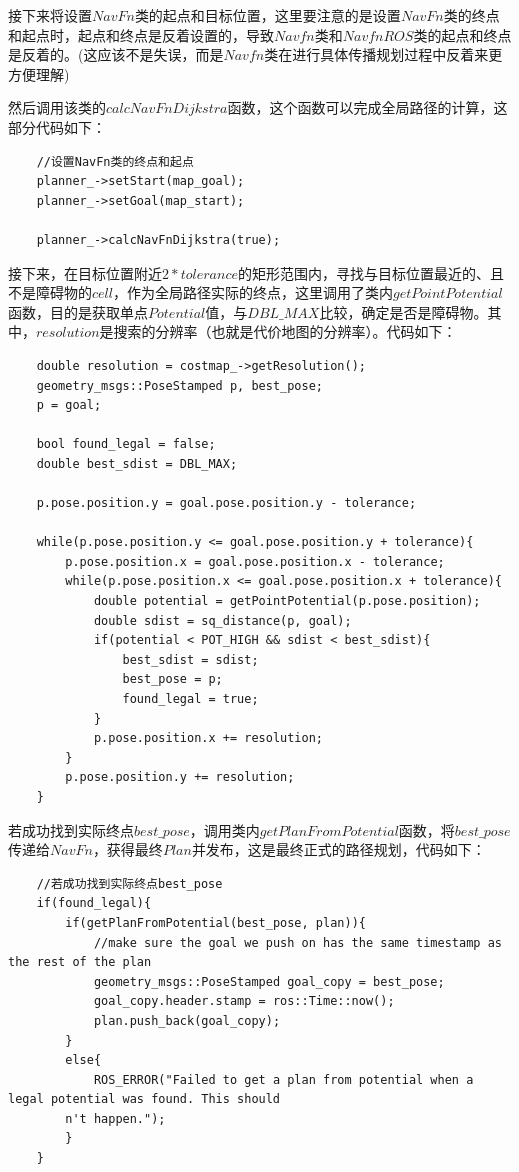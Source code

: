 \documentclass[9pt, oneside]{book}
\begin{document}
接下来将设置$NavFn$类的起点和目标位置，这里要注意的是设置$NavFn$类的终点和起点时，起点和终点是反着设置的，导致$Navfn$类和$NavfnROS$类的起点和终点是反着的。(这应该不是失误，而是$Navfn$类在进行具体传播规划过程中反着来更方便理解)

然后调用该类的$calcNavFnDijkstra$函数，这个函数可以完成全局路径的计算，这部分代码如下：

\begin{verbatim}
    //设置NavFn类的终点和起点
    planner_->setStart(map_goal);
    planner_->setGoal(map_start);

    planner_->calcNavFnDijkstra(true);
\end{verbatim}

接下来，在目标位置附近$2*tolerance$的矩形范围内，寻找与目标位置最近的、且不是障碍物的$cell$，作为全局路径实际的终点，这里调用了类内$getPointPotential$函数，目的是获取单点$Potential$值，与$DBL\_MAX$比较，确定是否是障碍物。其中，$resolution$是搜索的分辨率（也就是代价地图的分辨率）。代码如下：

\begin{verbatim}
    double resolution = costmap_->getResolution();
    geometry_msgs::PoseStamped p, best_pose;
    p = goal;

    bool found_legal = false;
    double best_sdist = DBL_MAX;

    p.pose.position.y = goal.pose.position.y - tolerance;

    while(p.pose.position.y <= goal.pose.position.y + tolerance){
        p.pose.position.x = goal.pose.position.x - tolerance;
        while(p.pose.position.x <= goal.pose.position.x + tolerance){
            double potential = getPointPotential(p.pose.position);
            double sdist = sq_distance(p, goal);
            if(potential < POT_HIGH && sdist < best_sdist){
                best_sdist = sdist;
                best_pose = p;
                found_legal = true;
            }
            p.pose.position.x += resolution;
        }
        p.pose.position.y += resolution;
    }
\end{verbatim}

若成功找到实际终点$best\_pose$，调用类内$getPlanFromPotential$函数，将$best\_pose$传递给$NavFn$，获得最终$Plan$并发布，这是最终正式的路径规划，代码如下：

\footnotesize
\begin{verbatim}
    //若成功找到实际终点best_pose
    if(found_legal){
        if(getPlanFromPotential(best_pose, plan)){
            //make sure the goal we push on has the same timestamp as the rest of the plan
            geometry_msgs::PoseStamped goal_copy = best_pose;
            goal_copy.header.stamp = ros::Time::now();
            plan.push_back(goal_copy);
        }
        else{
            ROS_ERROR("Failed to get a plan from potential when a legal potential was found. This should
        n't happen.");
        }
    }
\end{verbatim}
\normalsize
\end{document}
